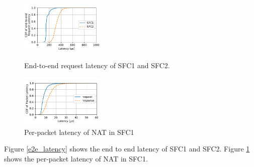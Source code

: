 \begin{figure}   
  \begin{minipage}[t]{0.47\columnwidth}  
    \centering
    \includegraphics[width=4.0cm]{fig/e2e_latency_chain12.pdf}  
     
    \caption{\small{End-to-end request latency of SFC1 and SFC2.}}  
    \label{e2e_latency}   
  \end{minipage}%
  \hfill 
  \hfill 
  \begin{minipage}[t]{0.47\columnwidth}
    \centering   
    \includegraphics[width=4.0cm]{fig/cdf_chain1.pdf}   
    \caption{\small{Per-packet latency of NAT in SFC1}}  
    \label{nat_latency}   
  \end{minipage}  

\end{figure}

Figure \ref{e2e_latency} shows the end to end latency of SFC1 and SFC2. 
Figure \ref{nat_latency} shows the per-packet latency of NAT in SFC1. 




